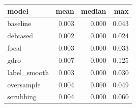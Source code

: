 \begin{tabular}{lrrr}
\toprule
\textbf{model} & \textbf{mean} & \textbf{median} & \textbf{max} \\
\midrule
baseline & 0.003 & 0.000 & 0.043 \\
debiased & 0.002 & 0.000 & 0.024 \\
focal & 0.003 & 0.000 & 0.033 \\
gdro & 0.007 & 0.000 & 0.125 \\
label\_smooth & 0.003 & 0.000 & 0.030 \\
oversample & 0.004 & 0.000 & 0.049 \\
scrubbing & 0.004 & 0.000 & 0.060 \\
\bottomrule
\end{tabular}
